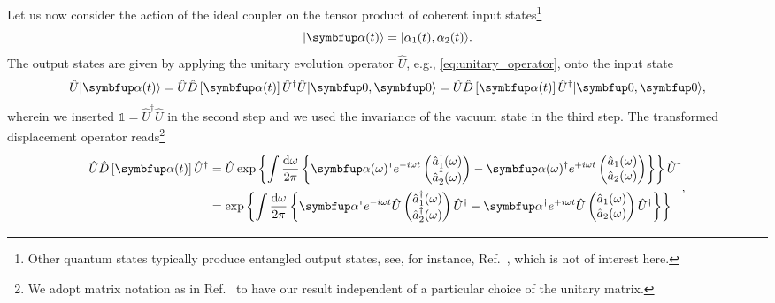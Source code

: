 Let us now consider the action of the ideal coupler on the tensor product of coherent input states\footnote{Other quantum states typically produce entangled output states, see, for instance, Ref.~\cite{Windhager2011}, which is not of interest here.}
\begin{equation}
	\ket*{\vb{\alpha}(t)}
	=
	\ket*{\alpha_1(t),\alpha_2(t)}
	.
\end{equation}
The output states are given by applying the unitary evolution operator $\hat{U}$, e.g., \cref{eq:unitary_operator}, onto the input state
\begin{equation}
	\hat{U}
	\ket*{\vb{\alpha}(t)}
	=
	\hat{U}
	\hat{D}\left[\vb{\alpha}(t)\right]
	\hat{U}^\dagger
	\hat{U}
	\ket*{\vb{0},\vb{0}}
	=
	\hat{U}
	\hat{D}\left[\vb{\alpha}(t)\right]
	\hat{U}^\dagger
	\ket*{\vb{0},\vb{0}}
	,
\end{equation}
wherein we inserted $\mathbb{1}=\hat{U}^\dagger\hat{U}$ in the second step and we used the invariance of the vacuum state in the third step.
The transformed displacement operator reads\footnote{We adopt matrix notation as in Ref.~\cite[p.~206]{Vogel2006} to have our result independent of a particular choice of the unitary matrix.}
\begin{equation}
	\begin{split}
		\hat{U}
		\hat{D}\left[\vb{\alpha}(t)\right]
		\hat{U}^\dagger
		&=
		\hat{U}
		\exp\left\{
			\int\frac{\dd{\omega}}{2\pi}
			\left\{
				\vb{\alpha}(\omega)^\trans
				e^{-i\omega t}
				\begin{pmatrix}
					\hat{a}_1^\dagger(\omega) \\
					\hat{a}_2^\dagger(\omega)
				\end{pmatrix}
				-
				\vb{\alpha}(\omega)^\dagger
				e^{+i\omega t}
				\begin{pmatrix}
					\hat{a}_1(\omega) \\
					\hat{a}_2(\omega)
				\end{pmatrix}
			\right\}
		\right\}
		\hat{U}^\dagger
		\\
		&=
		\exp\left\{
			\int\frac{\dd{\omega}}{2\pi}
			\left\{
				\vb{\alpha}^\trans
				e^{-i\omega t}
				\hat{U}
				\begin{pmatrix}
					\hat{a}_1^\dagger(\omega) \\
					\hat{a}_2^\dagger(\omega)
				\end{pmatrix}
				\hat{U}^\dagger
				-
				\vb{\alpha}^\dagger
				e^{+i\omega t}
				\hat{U}
				\begin{pmatrix}
					\hat{a}_1(\omega) \\
					\hat{a}_2(\omega)
				\end{pmatrix}
				\hat{U}^\dagger
			\right\}
		\right\}
	\end{split}
	\label{eq:displacement_operator_transformed}
	,
\end{equation}
